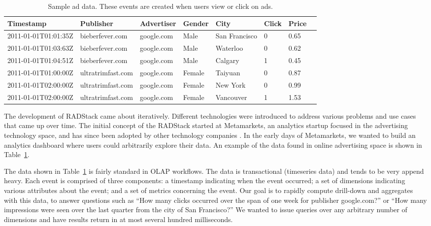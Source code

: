 \documentclass{vldb}
\begin{document}
\begin{table}
\centering
\begin{tabular}{| l | l | l | l | l | l | l | l |}
  \hline
  \textbf{Timestamp} & \textbf{Publisher} & \textbf{Advertiser} & \textbf{Gender} & \textbf{City} & \textbf{Click} & \textbf{Price} \\ \hline
  2011-01-01T01:01:35Z & bieberfever.com & google.com & Male & San Francisco & 0 & 0.65 \\ \hline
  2011-01-01T01:03:63Z & bieberfever.com & google.com & Male & Waterloo & 0 & 0.62 \\ \hline
  2011-01-01T01:04:51Z & bieberfever.com & google.com & Male & Calgary & 1 & 0.45 \\ \hline
  2011-01-01T01:00:00Z & ultratrimfast.com & google.com & Female & Taiyuan & 0 & 0.87 \\ \hline
  2011-01-01T02:00:00Z & ultratrimfast.com & google.com & Female & New York & 0 & 0.99 \\ \hline
  2011-01-01T02:00:00Z & ultratrimfast.com & google.com & Female & Vancouver & 1 & 1.53 \\ \hline
\end{tabular}
\caption{Sample ad data. These events are created when users view or click on ads.}
\label{tab:sample_data}
\end{table}

The development of RADStack came about iteratively. Different technologies were
introduced to address various problems and use cases that came up over time.
The initial concept of the RADStack started at Metamarkets, an analytics
startup focused in the advertising technology space, and has since been adopted
by other technology companies \cite{2014yahoo}. In the early days of Metamarkets, we wanted
to build an analytics dashboard where users could arbitrarily explore their
data. An example of the data found in online advertising space is shown in
Table~\ref{tab:sample_data}. 

The data shown in Table~\ref{tab:sample_data} is fairly standard in OLAP
workflows. The data is transactional (timeseries data) and tends to be very
append heavy. Each event is comprised of three components: a timestamp
indicating when the event occurred; a set of dimensions indicating various
attributes about the event; and a set of metrics concerning the event. Our goal
is to rapidly compute drill-down and aggregates with this data, to answer
questions such as “How many clicks occurred over the span of one week for
publisher google.com?” or “How many impressions were seen over the last quarter
from the city of San Francisco?” We wanted to issue queries over any arbitrary
number of dimensions and have results return in at most several hundred
milliseconds.
\end{document}

